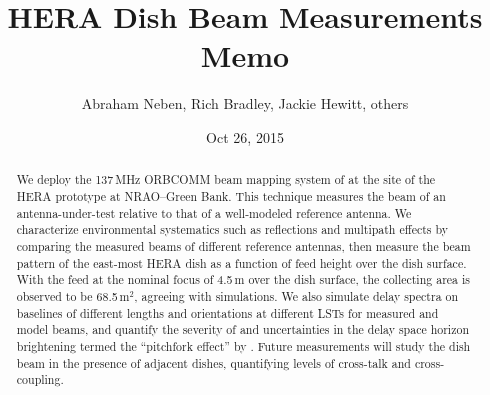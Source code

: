 \documentclass[preprint]{aastex}
\begin{document}
\title{HERA Dish Beam Measurements Memo}


\author{Abraham Neben, Rich Bradley, Jackie Hewitt, others}

\author{Oct 26, 2015}



\begin{abstract}
We deploy the 137\,MHz ORBCOMM beam mapping system of \citet{neben15} at the site of the HERA prototype at NRAO--Green Bank. This technique measures the beam of an antenna-under-test relative to that of a well-modeled reference antenna. We characterize environmental systematics such as reflections and multipath effects by comparing the measured beams of different reference antennas, then measure the beam pattern of the east-most HERA dish as a function of feed height over the dish surface. With the feed at the nominal focus of 4.5\,m over the dish surface, the collecting area is observed to be 68.5\,m$^2$, agreeing with simulations. We also simulate delay spectra on baselines of different lengths and orientations at different LSTs for measured and model beams, and quantify the severity of and uncertainties in the delay space horizon brightening termed the ``pitchfork effect'' by \citet{nithya15}. Future measurements will study the dish beam in the presence of adjacent dishes, quantifying levels of cross-talk and cross-coupling.
\end{abstract}

\end{document}
